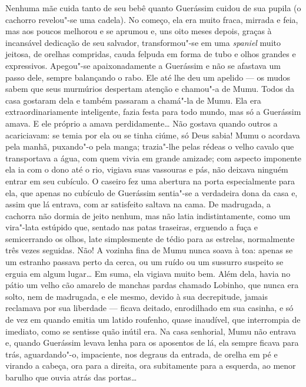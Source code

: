 Nenhuma mãe cuida tanto de seu bebê quanto Guerássim cuidou de sua
pupila (o cachorro revelou"-se uma cadela). No começo, ela era muito
fraca, mirrada e feia, mas aos poucos melhorou e se aprumou e, uns oito
meses depois, graças à incansável dedicação de seu salvador,
transformou"-se em uma \emph{spaniel} muito jeitosa, de orelhas
compridas, cauda felpuda em forma de tubo e olhos grandes e expressivos.
Apegou"-se apaixonadamente a Guerássim e não se afastava um passo dele,
sempre balançando o rabo. Ele até lhe deu um apelido --- os mudos sabem
que seus murmúrios despertam atenção e chamou"-a de Mumu. Todos da casa
gostaram dela e também passaram a chamá"-la de Mumu. Ela era
extraordinariamente inteligente, fazia festa para todo mundo, mas só a
Guerássim amava. E ele próprio a amava perdidamente\ldots{} Não gostava
quando outros a acariciavam: se temia por ela ou se tinha ciúme, só Deus
sabia! Mumu o acordava pela manhã, puxando"-o pela manga; trazia"-lhe
pelas rédeas o velho cavalo que transportava a água, com quem vivia em
grande amizade; com aspecto imponente ela ia com o dono até o rio,
vigiava suas vassouras e pás, não deixava ninguém entrar em seu
cubículo. O caseiro fez uma abertura na porta especialmente para ela,
que apenas no cubículo de Guerássim sentia"-se a verdadeira dona da casa e, assim que lá entrava, com ar satisfeito saltava na cama.
De madrugada, a cachorra não dormia de jeito nenhum, mas não latia
indistintamente, como um vira"-lata estúpido que, sentado nas patas
traseiras, erguendo a fuça e semicerrando os olhos, late simplesmente de
tédio para as estrelas, normalmente três vezes seguidas. Não! A vozinha
fina de Mumu nunca soava à toa: apenas se um estranho passava perto da cerca,
ou um ruído ou um sussurro suspeito se erguia em algum lugar\ldots{} Em suma,
ela vigiava muito bem. Além dela, havia no pátio um velho cão amarelo de
manchas pardas chamado Lobinho, que nunca era solto, nem de madrugada, e
ele mesmo, devido à sua decrepitude, jamais reclamava por sua liberdade
--- ficava deitado, enrodilhado em sua casinha, e só de vez em quando
emitia um latido roufenho, quase inaudível, que interrompia de imediato,
como se sentisse quão inútil era. Na casa senhorial, Mumu não entrava e,
quando Guerássim levava lenha para os aposentos de lá, ela sempre ficava para
trás, aguardando"-o, impaciente, nos degraus da entrada, de orelha em pé
e virando a cabeça, ora para a direita, ora subitamente para a esquerda,
ao menor barulho que ouvia atrás das portas\ldots{}

